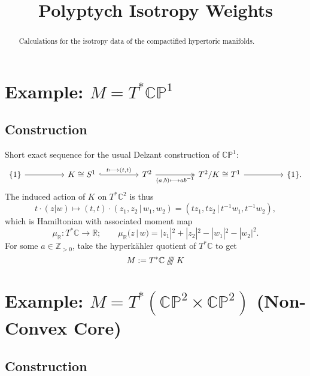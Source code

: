 \documentclass{article}
\title{Polyptych Isotropy Weights}
\date{}	%
\newcommand{\lra}{\longrightarrow}
\newcommand{\HK}{hyperk\"ahler }
\newcommand{\PP}{\mathbb{P}}
\newcommand{\RR}{\mathbb{R}}
\newcommand{\CC}{\mathbb{C}}
\newcommand{\ZZ}{\mathbb{Z}}
\newcommand{\sssslash}{\mathbin{/\mkern-6mu/\mkern-6mu/\mkern-6mu/}}
\begin{document}
	\maketitle
	
	\begin{abstract}
		Calculations for the isotropy data of the compactified hypertoric manifolds.
	\end{abstract}
	
	\section{Example: $M = T^{\ast}\CC\PP^{1}$}
	
	\subsection{Construction}
	
	Short exact sequence for the usual Delzant construction of $\CC\PP^{1}$:
	\[
		\begin{tikzcd}
				\{1\} \arrow[rr] &  & K \cong S^{1} \arrow[rr, "{t \longmapsto (t,t)}", hook] &  & T^{2} \arrow[rr, "{(a,b) \longmapsto ab^{-1}}"', two heads] &  & T^{2}/K \cong T^{1} \arrow[rr] &  & \{1\}.
		\end{tikzcd}
	\]
	The induced action of $K$ on $T^{\ast}\CC^{2}$ is thus
	\[
		t \cdot (z|w) \longmapsto (t, t) \cdot (z_{1}, z_{2}\, |\, w_{1}, w_{2}) = (t z_{1}, t z_{2}\, |\, t^{-1} w_{1}, t^{-1} w_{2}),
	\]
	which is Hamiltonian with associated moment map
	\[
		\mu_{\RR} : T^{\ast}\CC \lra \RR; \qquad  \mu_{\RR}(z\, |\, w) = |z_{1}|^{2} + |z_{2}|^{2} - |w_{1}|^{2} - |w_{2}|^{2}.
	\]
	For some $a \in \ZZ_{>0}$, take the \HK quotient of $T^{\ast}\CC$ to get
	\[
		M := T^{\ast}\CC \sssslash K
	\]

	\section{Example: $M = T^{\ast}(\CC\PP^{2} \times \CC\PP^{2})$ (Non-Convex Core)}
	
	\subsection{Construction}
	
\end{document}
